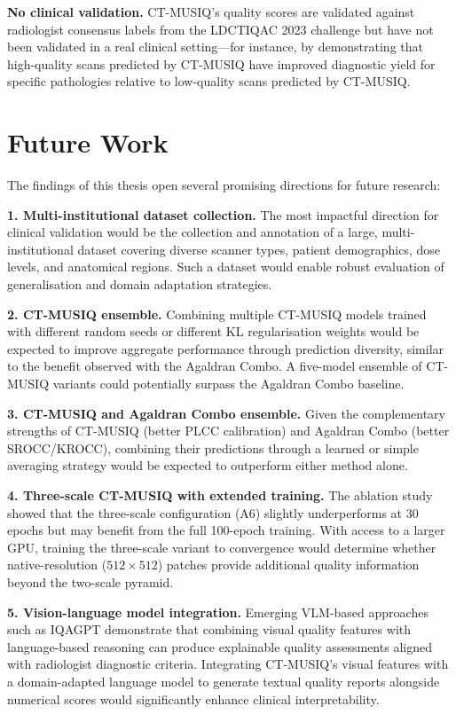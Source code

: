\textbf{No clinical validation.} CT-MUSIQ's quality scores are validated against
radiologist consensus labels from the LDCTIQAC 2023 challenge but have not been validated
in a real clinical setting---for instance, by demonstrating that high-quality scans
predicted by CT-MUSIQ have improved diagnostic yield for specific pathologies relative
to low-quality scans predicted by CT-MUSIQ.


\section{Future Work}
\label{sec:conc_future}

The findings of this thesis open several promising directions for future research:

\textbf{1. Multi-institutional dataset collection.} The most impactful direction for
clinical validation would be the collection and annotation of a large, multi-institutional
dataset covering diverse scanner types, patient demographics, dose levels, and anatomical
regions. Such a dataset would enable robust evaluation of generalisation and domain
adaptation strategies.

\textbf{2. CT-MUSIQ ensemble.} Combining multiple CT-MUSIQ models trained with different
random seeds or different KL regularisation weights would be expected to improve
aggregate performance through prediction diversity, similar to the benefit observed with
the Agaldran Combo. A five-model ensemble of CT-MUSIQ variants could potentially surpass
the Agaldran Combo baseline.

\textbf{3. CT-MUSIQ and Agaldran Combo ensemble.} Given the complementary strengths of
CT-MUSIQ (better PLCC calibration) and Agaldran Combo (better SROCC/KROCC), combining
their predictions through a learned or simple averaging strategy would be expected to
outperform either method alone.

\textbf{4. Three-scale CT-MUSIQ with extended training.} The ablation study showed that
the three-scale configuration (A6) slightly underperforms at 30 epochs but may benefit
from the full 100-epoch training. With access to a larger GPU, training the three-scale
variant to convergence would determine whether native-resolution ($512 \times 512$)
patches provide additional quality information beyond the two-scale pyramid.

\textbf{5. Vision-language model integration.} Emerging VLM-based approaches such as
IQAGPT \cite{chen2024iqagpt} demonstrate that combining visual quality features with
language-based reasoning can produce explainable quality assessments aligned with
radiologist diagnostic criteria. Integrating CT-MUSIQ's visual features with a
domain-adapted language model to generate textual quality reports alongside numerical
scores would significantly enhance clinical interpretability.

